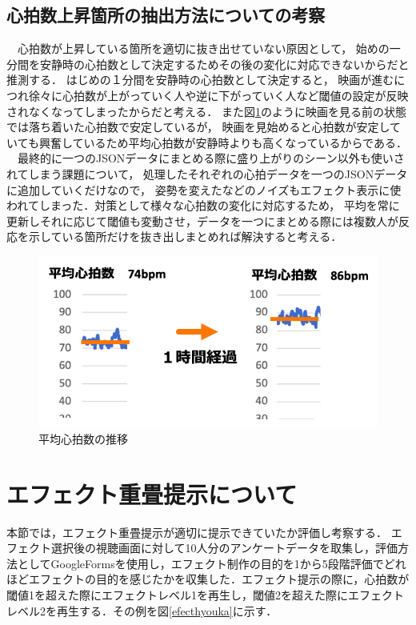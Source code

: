 \subsection{心拍数上昇箇所の抽出方法についての考察}
　心拍数が上昇している箇所を適切に抜き出せていない原因として，
始めの一分間を安静時の心拍数として決定するためその後の変化に対応できないからだと推測する．
はじめの１分間を安静時の心拍数として決定すると，
映画が進むにつれ徐々に心拍数が上がっていく人や逆に下がっていく人など閾値の設定が反映されなくなってしまったからだと考える．
また図\ref{kekka2}のように映画を見る前の状態では落ち着いた心拍数で安定しているが，
映画を見始めると心拍数が安定していても興奮しているため平均心拍数が安静時よりも高くなっているからである．
　最終的に一つのJSONデータにまとめる際に盛り上がりのシーン以外も使いされてしまう課題について，
処理したそれぞれの心拍データを一つのJSONデータに追加していくだけなので，
姿勢を変えたなどのノイズもエフェクト表示に使われてしまった．対策として様々な心拍数の変化に対応するため，
平均を常に更新しそれに応じて閾値も変動させ，データを一つにまとめる際には複数人が反応を示している箇所だけを抜き出しまとめれば解決すると考える． 

\begin{figure}[H]
    \centering
    \includegraphics[width=13cm]{images/chapter4/bpmave.png}
    \caption{平均心拍数の推移}
    \label{kekka2}
\end{figure}

\section{エフェクト重畳提示について}
本節では，エフェクト重畳提示が適切に提示できていたか評価し考察する．
エフェクト選択後の視聴画面に対して10人分のアンケートデータを取集し，評価方法としてGoogleFormsを使用し，エフェクト制作の目的を1から5段階評価でどれほどエフェクトの目的を感じたかを収集した．エフェクト提示の際に，心拍数が閾値1を超えた際にエフェクトレベル1を再生し，閾値2を超えた際にエフェクトレベル2を再生する．その例を図\ref{efecthyouka}に示す．


